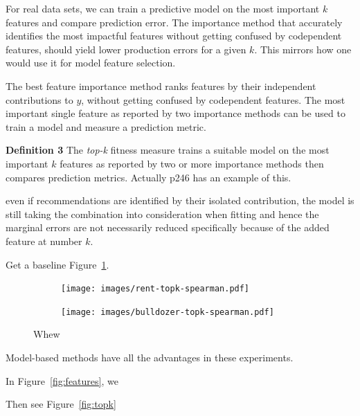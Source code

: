 \documentclass[12pt]{article}
\newcommand{\figref}[1]{Figure~\ref{#1}}
\begin{document}
For real data sets, we can train a predictive model on the most important $k$ features and compare prediction error. The importance method that accurately identifies the most impactful features without getting confused by codependent features, should yield lower production errors for a given $k$.   This mirrors how one would use it for model feature selection.
 
The best feature importance method ranks features by their independent contributions to $y$, without getting confused by codependent features. The most important single feature as reported by two importance methods can be used to train a model and measure a prediction metric.
 
{\bf Definition 3} The {\em top-k} fitness measure trains a suitable model on the  most important $k$ features as reported by two or more importance methods then compares prediction metrics. Actually p246 \cite{liu-fs} has an example of this.

even if recommendations are identified by their isolated contribution, the model is still taking the combination into consideration when fitting and hence the marginal errors are not necessarily reduced specifically because of the added feature at number $k$.

Get a baseline \figref{fig:baseline}.

\begin{figure}[b]
\centering
\begin{subfigure}{.5\textwidth}
    \centering
\texttt{[image: images/rent-topk-spearman.pdf]}
\vspace{-2mm}\vspace{3mm}
\end{subfigure}%
\begin{subfigure}{.5\textwidth}
    \centering
\texttt{[image: images/bulldozer-topk-spearman.pdf]}
\vspace{-2mm}\vspace{3mm}
\end{subfigure}
\caption{Whew}
\label{fig:baseline}
\end{figure}

Model-based methods have all the advantages in these experiments.

In \figref{fig:features}, we

Then see \figref{fig:topk}
\end{document}
